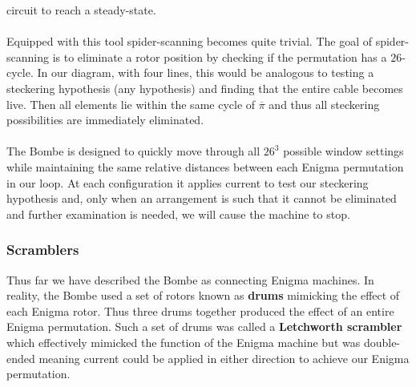 circuit to reach
a steady-state.
\\\\Equipped with this tool spider-scanning becomes quite trivial.
The goal of spider-scanning is to eliminate a rotor position by
checking if the permutation has a $26$-cycle. In our diagram, with four lines,
this would be analogous to testing a steckering hypothesis (any
hypothesis) and finding that the entire cable becomes live. Then all
elements lie within the same cycle of $\overline\pi$ and thus all
steckering possibilities are immediately eliminated.
\\\\The Bombe is designed to quickly move through all $26^3$ possible
window settings while maintaining the same relative distances between
each Enigma permutation in our loop. At each configuration
it applies current to test our steckering hypothesis and, only when
an arrangement is such that it
cannot be eliminated and further examination is needed, we will cause
the machine to stop.

\subsubsection{Scramblers}
Thus far we have described the Bombe as connecting Enigma machines.
In reality, the Bombe used a set of rotors known as {\bf{drums}}
mimicking the effect of each Enigma rotor. Thus three drums together
produced the effect of an entire Enigma permutation. Such a set of
drums was called a {\bf{Letchworth scrambler}} which effectively
mimicked the function of the Enigma machine but was double-ended
meaning current could be applied in either direction to achieve our
Enigma permutation.

